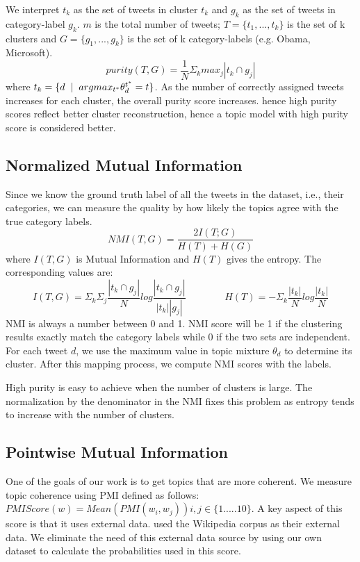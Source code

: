 \documentclass[10pt,a5paper,twoside]{article}
\begin{document}
We interpret $t_{k}$ as the set of tweets in cluster $t_{k}$ and $g_{k}$ as the set of tweets in category-label $g_{k}$. $m$ is the total number of tweets; $T = \lbrace t_{1}, ... , t_{k} \rbrace$ is the set of k clusters and $ G = \lbrace g_{1}, ... , g_{k}\rbrace $ is the set of k category-labels (e.g. Obama, Microsoft).
\[
 purity (T,G) = \frac{1}{N} \Sigma_{k} max_{j} |t_{k} \cap g_{j}|
\]
where $ t_k = \lbrace  d \hspace{2 mm} |  \hspace{2 mm} argmax_{t^*} \theta^{t^{*}}_d = t \rbrace $.
As the number of correctly assigned tweets increases for each cluster, the overall purity score increases. hence high purity scores reflect better cluster reconstruction, hence a topic model with high purity score is considered better.
\\

\subsection{Normalized Mutual Information}
Since we know the ground truth label of all the tweets in the dataset, i.e., their categories, we can measure the quality by how likely the topics agree with the true category labels. 
\[
NMI(T,G) = \frac{2 I(T;G)}{H(T) + H(G)} 
\]
where $I(T,G)$ is Mutual Information and $H(T)$ gives the entropy. The 
corresponding values are:
\[
I(T,G) = \Sigma_{k} \Sigma_{j} \frac{|t_{k} \cap g_{j}|}{N} log \frac{|t_{k} \cap g_{j}|}{|t_{k}| |g_{j}|} 
~~~~~~~~~~~~~~~~~~
H(T) = - \Sigma_k \frac{|t_k|}{N} log \frac{|t_k|}{N} 
\]
NMI \cite{MRS08} is always a number between 0 and 1. NMI score will be 1 if the clustering results exactly match the category labels while 0 if the two sets are independent. For each tweet $d$, we use the maximum value in topic mixture $ \theta_{d} $ to determine its cluster. After this mapping process, we compute NMI scores with the labels.

High purity is easy to achieve when the number of clusters is large. The normalization by the denominator in the NMI fixes this problem as entropy tends to increase with the number of clusters.

\subsection{Pointwise Mutual Information}

One of the goals of our work is to get topics that are more coherent. 
We measure topic coherence using PMI defined as follows:
$PMI Score(w) = Mean ( PMI(w_i,w_j) ) i,j \in \lbrace1.....10\rbrace $.
A key aspect of this score is that it uses external data.  \cite{baldwin10} used the Wikipedia corpus as their external data. We eliminate the need of this external data source by using our own dataset to calculate the probabilities used in this score.\\
\end{document}
